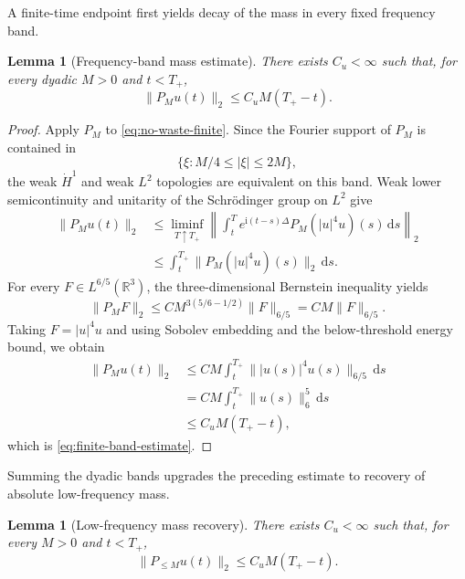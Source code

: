 \documentclass{interact}
\numberwithin{equation}{section}
\theoremstyle{plain}
\newtheorem{lemma}[theorem]{Lemma}
\theoremstyle{definition}
\theoremstyle{remark}
\newcommand{\R}{\mathbb R}
\newcommand{\ii}{\mathrm i}
\newcommand{\dd}{\,\mathrm d}
\begin{document}
A finite-time endpoint first yields decay of the mass in every fixed frequency band.

\begin{lemma}[Frequency-band mass estimate]\label{lem:finite-band}
There exists $C_u<\infty$ such that, for every dyadic $M>0$ and $t<T_+$,
\begin{equation}\label{eq:finite-band-estimate}
 \|P_Mu(t)\|_2\le C_uM(T_+-t).
\end{equation}
\end{lemma}

\begin{proof}
Apply $P_M$ to \eqref{eq:no-waste-finite}. Since the Fourier support of $P_M$ is contained in
\[
 \{\xi:M/4\le|\xi|\le2M\},
\]
the weak $\dot H^1$ and weak $L^2$ topologies are equivalent on this band. Weak lower semicontinuity and unitarity of the Schr\"odinger group on $L^2$ give
\begin{align*}
 \|P_Mu(t)\|_2
 &\le \liminf_{T\uparrow T_+}
 \left\|\int_t^T e^{\ii(t-s)\Delta}P_M(|u|^4u)(s)\dd s\right\|_2\\
 &\le \int_t^{T_+}\|P_M(|u|^4u)(s)\|_2\dd s.
\end{align*}
For every $F\in L^{6/5}(\R^3)$, the three-dimensional Bernstein inequality yields
\[
 \|P_MF\|_2
 \le C M^{3(5/6-1/2)}\|F\|_{6/5}
 =CM\|F\|_{6/5}.
\]
Taking $F=|u|^4u$ and using Sobolev embedding and the below-threshold energy bound, we obtain
\begin{align*}
 \|P_Mu(t)\|_2
 &\le CM\int_t^{T_+}\||u(s)|^4u(s)\|_{6/5}\dd s\\
 &=CM\int_t^{T_+}\|u(s)\|_6^5\dd s\\
 &\le C_uM(T_+-t),
\end{align*}
which is \eqref{eq:finite-band-estimate}.
\end{proof}

Summing the dyadic bands upgrades the preceding estimate to recovery of absolute low-frequency mass.

\begin{lemma}[Low-frequency mass recovery]\label{lem:finite-low}
There exists $C_u<\infty$ such that, for every $M>0$ and $t<T_+$,
\begin{equation}\label{eq:finite-low-estimate}
 \|P_{\le M}u(t)\|_2\le C_uM(T_+-t).
\end{equation}
\end{lemma}
\end{document}
